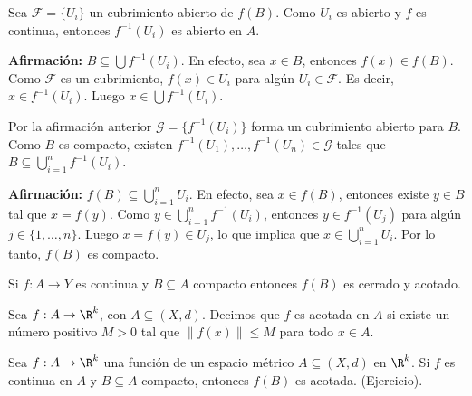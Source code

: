 \begin{dem}
Sea $\mathcal{F} = \{U_i\}$ un cubrimiento abierto de $f(B)$. %
Como $U_i$ es abierto y $f$ es continua, entonces $f^{-1}(U_i)$ es abierto en $A$. %

\textbf{Afirmación:} $B\subseteq\bigcup f^{-1}(U_i)$. %
En efecto, sea $x\in B$, entonces $f(x)\in f(B)$. %
Como $\mathcal{F}$ es un cubrimiento, $f(x) \in U_i$ para algún $U_i \in \mathcal{F}$. %
Es decir, $x\in f^{-1}(U_i)$. Luego $x\in \bigcup f^{-1}(U_i)$. %

Por la afirmación anterior $\mathcal{G}=\{f^{-1}(U_i)\}$ forma un cubrimiento abierto para $B$. %
Como $B$ es compacto, existen $f^{-1}(U_1), \dots, f^{-1}(U_n) \in \mathcal{G}$ tales que $B\subseteq\bigcup_{i=1}^{n}f^{-1}(U_i)$. %

\textbf{Afirmación:} $f(B)\subseteq\bigcup_{i=1}^{n}U_i$. %
En efecto, sea $x\in f(B)$, entonces existe $y\in B$ tal que $x=f(y)$. %
Como $y \in \bigcup_{i=1}^{n}f^{-1}(U_i)$, entonces $y\in f^{-1}(U_j)$ para algún $j \in \{1, \dots, n\}$. %
Luego $x=f(y)\in U_j$, lo que implica que $x\in\bigcup_{i=1}^{n} U_i$. %
Por lo tanto, $f(B)$ es compacto. %
\end{dem}

\begin{remark}
Si $f:A\rightarrow Y$ es continua y $B\subseteq A$ compacto entonces $f(B)$ es cerrado y acotado. %
\end{remark}

\begin{definicion}
Sea $f:A\rightarrow \R^{k}$, con $A\subseteq (X,d)$. Decimos que $f$ es acotada en $A$ si existe un número positivo $M>0$ tal que $\|f(x)\|\le M$ para todo $x\in A$. %
\end{definicion}

\begin{teorema}
Sea $f:A\rightarrow \R^{k}$ una función de un espacio métrico $A\subseteq (X,d)$ en $\R^{k}$. Si $f$ es continua en $A$ y $B\subseteq A$ compacto, entonces $f(B)$ es acotada. (Ejercicio). %
\end{teorema}

